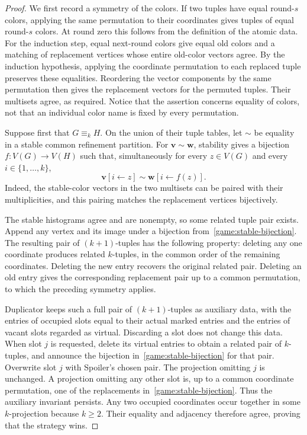 \documentclass[11pt]{article}
\theoremstyle{definition}
\begin{document}
\begin{proof}
We first record a symmetry of the colors.  If two tuples have equal
round-$s$ colors, applying the same permutation to their coordinates gives
tuples of equal round-$s$ colors.  At round zero this follows from the
definition of the atomic data.  For the induction step, equal next-round
colors give equal old colors and a matching of replacement vertices whose
entire old-color vectors agree.  By the induction hypothesis, applying the
coordinate permutation to each replaced tuple preserves these equalities.
Reordering the vector components by the same permutation then gives the
replacement vectors for the permuted tuples.  Their multisets agree, as
required.  Notice that the assertion concerns equality of colors, not that
an individual color name is fixed by every permutation.

Suppose first that $G\equiv_k H$.  On the union of their tuple tables, let
$\sim$ be equality in a stable common refinement partition.  For
$\mathbf v\sim\mathbf w$, stability gives a bijection
$f:V(G)\to V(H)$ such that, simultaneously for every $z\in V(G)$ and every
$i\in\{1,\ldots,k\}$,
\begin{equation}
\label{game:stable-bijection}
 \mathbf v[i\leftarrow z]\sim\mathbf w[i\leftarrow f(z)].
\end{equation}
Indeed, the stable-color vectors in the two multisets can be paired with
their multiplicities, and this pairing matches the replacement vertices
bijectively.

The stable histograms agree and are nonempty, so some related tuple pair
exists.  Append any vertex and its image under a bijection
from~\eqref{game:stable-bijection}.  The resulting pair of $(k+1)$-tuples
has the following property: deleting any one coordinate produces related
$k$-tuples, in the common order of the remaining coordinates.  Deleting
the new entry recovers the original related pair.  Deleting an old entry
gives the corresponding replacement pair up to a common permutation, to
which the preceding symmetry applies.

Duplicator keeps such a full pair of $(k+1)$-tuples as auxiliary data,
with the entries of occupied slots equal to their actual marked entries
and the entries of vacant slots regarded as virtual.  Discarding a slot
does not change this data.  When slot $j$ is requested, delete its virtual
entries to obtain a related pair of $k$-tuples, and announce the bijection
in~\eqref{game:stable-bijection} for that pair.  Overwrite slot $j$ with
Spoiler's chosen pair.  The projection omitting $j$ is unchanged.  A
projection omitting any other slot is, up to a common coordinate
permutation, one of the replacements in~\eqref{game:stable-bijection}.
Thus the auxiliary invariant persists.  Any two occupied coordinates occur
together in some $k$-projection because $k\geq 2$.  Their equality and
adjacency therefore agree, proving that the strategy wins.


\end{proof}
\end{document}
